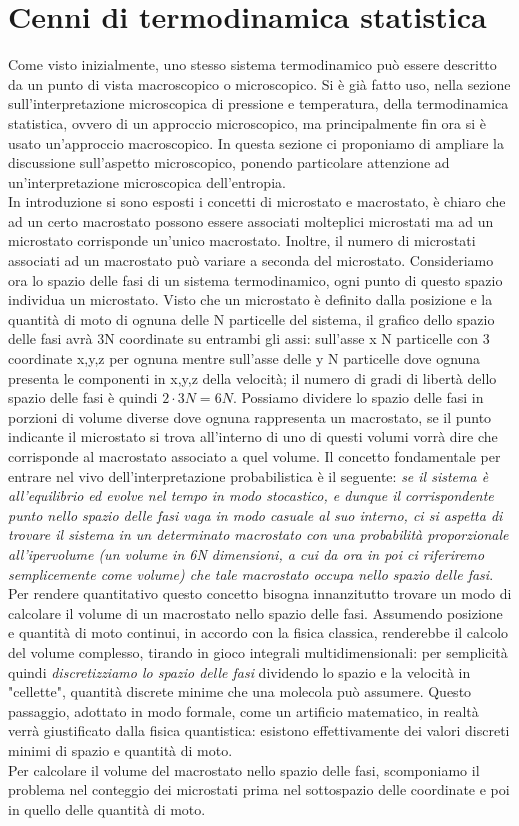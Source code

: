 \documentclass[
10pt, %
a4paper, %
oneside, %
headinclude,footinclude, %
BCOR5mm, %
]{scrartcl}
\begin{document}
\section{Cenni di termodinamica statistica}
Come visto inizialmente, uno stesso sistema termodinamico può essere descritto da un punto di vista macroscopico o microscopico. Si è già fatto uso, nella sezione sull'interpretazione microscopica di pressione e temperatura, della termodinamica statistica, ovvero di un approccio microscopico, ma principalmente fin ora si è usato un'approccio macroscopico. In questa sezione ci proponiamo di ampliare la discussione sull'aspetto microscopico, ponendo particolare attenzione ad un'interpretazione microscopica dell'entropia.\\
In introduzione si sono esposti i concetti di microstato e macrostato, è chiaro che ad un certo macrostato possono essere associati molteplici microstati ma ad un microstato corrisponde un'unico macrostato. Inoltre, il numero di microstati associati ad un macrostato può variare a seconda del microstato. Consideriamo ora lo spazio delle fasi di un sistema termodinamico, ogni punto di questo spazio individua un microstato. Visto che un microstato è definito dalla posizione e la quantità di moto di ognuna delle N particelle del sistema, il grafico dello spazio delle fasi avrà 3N coordinate su entrambi gli assi: sull'asse x N particelle con 3 coordinate x,y,z per ognuna mentre sull'asse delle y N particelle dove ognuna presenta le componenti in x,y,z della velocità; il numero di gradi di libertà dello spazio delle fasi è quindi \(2\cdot3N = 6N\). Possiamo dividere lo spazio delle fasi in porzioni di volume diverse dove ognuna rappresenta un macrostato, se il punto indicante il microstato si trova all'interno di uno di questi volumi vorrà dire che corrisponde al macrostato associato a quel volume. Il concetto fondamentale per entrare nel vivo dell'interpretazione probabilistica è il seguente:
\textit{se il sistema è all’equilibrio ed evolve nel tempo in modo stocastico, e dunque il corrispondente punto nello spazio delle fasi vaga in modo casuale al suo interno, ci si aspetta di trovare il sistema in un determinato macrostato con una probabilità proporzionale all'ipervolume (un volume in 6N dimensioni, a cui da ora in poi ci riferiremo semplicemente come volume) che tale macrostato occupa nello spazio delle fasi}.\\
Per rendere quantitativo questo concetto bisogna innanzitutto trovare un modo di calcolare il volume di un macrostato nello spazio delle fasi. Assumendo posizione e quantità di moto continui, in accordo con la fisica classica, renderebbe il calcolo del volume complesso, tirando in gioco integrali multidimensionali: per semplicità quindi \textit{discretizziamo lo spazio delle fasi} dividendo lo spazio e la velocità in "cellette", quantità discrete minime che una molecola può assumere. Questo passaggio, adottato in modo formale, come un artificio matematico, in realtà verrà giustificato dalla fisica quantistica: esistono effettivamente dei valori discreti minimi di spazio e quantità di moto.\\
Per calcolare il volume del macrostato nello spazio delle fasi, scomponiamo il problema nel conteggio dei microstati prima nel sottospazio delle coordinate e poi in quello delle quantità di moto. 
\end{document}
